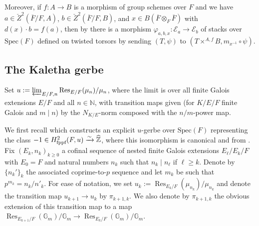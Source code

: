 \documentclass{amsart}
\theoremstyle{definition}
\theoremstyle{remark}
\DeclareMathOperator\Res{Res}
\newcommand\Spec{\mathrm{Spec}}
\newcommand{\ov}{\overline}
\newcommand\tn{\textnormal}
\begin{document}
Moreover, if $f \colon A \to B$ is a morphism of group schemes over $F$ and we have $a \in \check{Z}^{2}(\ov{F}/F,A)$, $b \in \check{Z}^{2}(\ov{F}/F,B)$, and $x \in B(\ov{F} \otimes_{F} \ov{F})$ with $d(x) \cdot b = f(a)$, then by \cite[Construction 2.38]{Dillery1} there is a morphism $\varphi_{a,b,x} \colon \mathcal{E}_{a} \to \mathcal{E}_{b}$ of stacks over $\Spec(F)$ defined on twisted torsors by sending $(T,\psi)$ to $(T \times^{A,f}B, m_{x^{-1}} \circ \psi)$.

\subsection{The Kaletha gerbe}\label{sec:kalgerbe}

Set $u:=\varprojlim_{E/F,n} \Res_{E/F}(\mu_{n})/\mu_{n}$, where the limit is over all finite Galois extensions $E/F$ and all $n \in \mathbb{N}$, with transition maps given (for $K/E/F$ finite Galois and $m \mid n$) by the $N_{K/E}$-norm composed with the $n/m$-power map. 

We first recall \cite[\S 4.3]{Dillery1} which constructs an explicit $u$-gerbe over $\Spec(F)$ representing the class  $-1 \in H^{2}_{\tn{fppf}}(F,u) \xrightarrow{\sim} \widehat{\mathbb{Z}}$, where this isomorphism is canonical and from \cite[Theorem 3.4]{Dillery1}. Fix $(E_{k},n_{k})_{k \geq 0}$ a cofinal sequence of nested finite Galois extensions $E_{\ell}/E_{k}/F$ with $E_{0} = F$ and natural numbers $n_{k}$ such that $n_{k} \mid n_{\ell}$ if $\ell \geq k$. Denote by $\{n_{k}'\}_{k}$ the associated coprime-to-$p$ sequence and let $m_{k}$ be such that $p^{m_{k}}=n_{k}/n'_{k}$. For ease of notation, we set $u_{k}:=\Res_{E_{k}/F}(\mu_{n_{k}})/\mu_{n_{k}}$ and denote the transition map $u_{k+1} \to u_{k}$ by $\pi_{k+1,k}$. We also denote by $\pi_{k+1,k}$ the obvious extension of this transition map to a map $\Res_{E_{k+1}/F}(\mathbb{G}_{m})/\mathbb{G}_{m} \to \Res_{E_{k}/F}(\mathbb{G}_{m})/\mathbb{G}_{m}$.
\end{document}
